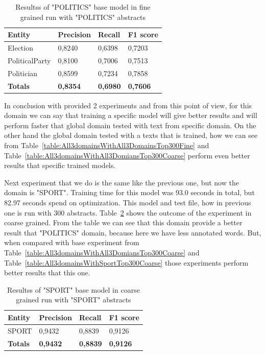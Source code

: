 \documentclass[thesis=M,english]{FITthesis}[2018/05/30]
\begin{document}
	\begin{table}[H]\centering
		\begin{tabular}{|l|l|l|l|}
			\hline {\textbf{Entity}} & {\textbf{Precision}} & {\textbf{Recall}} & {\textbf{F1 score}}\\\hline
				Election & 0,8240 & 0,6398 & 0,7203\\
				PoliticalParty & 0,8100 & 0,7006 & 0,7513\\
				Politician & 0,8599 & 0,7234 & 0,7858\\\hline
				\textbf{Totals} & \textbf{0,8354} & \textbf{0,6980} & \textbf{0,7606}\\\hline
		\end{tabular}
		\caption{Resultss of "POLITICS" base model in fine grained run with "POLITICS" abstracts \label{table:PoliticsdomainsWithPoliticsTop300Fine}}
	\end{table}	
	
	In conclusion with provided 2 experiments and from this point of view, for this domain we can say that training a specific model will give better results and will perform faster that global domain tested with text from specific domain. On the other hand the global domain tested with a texts that is trained, how we can see from Table~\ref{table:All3domainsWithAll3DomainsTop300Fine} and Table~\ref{table:All3domainsWithAll3DomiansTop300Coarse} perform even better results that specific trained models.  


Next experiment that we do is the same like the previous one, but now the domain is "SPORT". Training time for this model was 93.0 seconds in total, but 82.97 seconds spend on optimization. This model and test file, how in previous one is run with 300 abstracts. Table~\ref{table:SportdomainsWithSportTop300Coarse} shows the outcome of the experiment in coarse grained. From the table we can see that this domain provide a better result that "POLITICS" domain, because here we have less annotated words. But, when compared with base experiment from Table~\ref{table:All3domainsWithAll3DomiansTop300Coarse} and Table~\ref{table:All3domainsWithSportTop300Coarse} those experiments perform better results that this one. 
	\begin{table}[H]\centering
		\begin{tabular}{|l|l|l|l|}
			\hline {\textbf{Entity}} & {\textbf{Precision}} & {\textbf{Recall}} & {\textbf{F1 score}}\\\hline
				SPORT & 0,9432 & 0,8839 & 0,9126\\\hline
				\textbf{Totals} & \textbf{0,9432} & \textbf{0,8839} & \textbf{0,9126}\\\hline
		\end{tabular}
		\caption{Resultss of "SPORT" base model in coarse grained run with "SPORT" abstracts \label{table:SportdomainsWithSportTop300Coarse}}
	\end{table}
\end{document}
